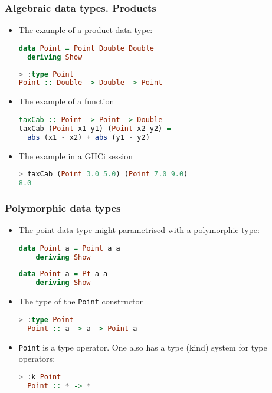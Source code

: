 \documentclass[10pt,pdf,utf8,russian,aspectratio=169]{beamer}
\begin{document}
\begin{frame}[fragile]
\frametitle{Algebraic data types. Products}

\begin{itemize}
\item The example of a product data type:

\begin{lstlisting}[language=Haskell]
data Point = Point Double Double
  deriving Show
\end{lstlisting}

\begin{lstlisting}[language=Haskell]
> :type Point
Point :: Double -> Double -> Point
\end{lstlisting}
\item The example of a function

\begin{lstlisting}[language=Haskell]
taxCab :: Point -> Point -> Double
taxCab (Point x1 y1) (Point x2 y2) =
  abs (x1 - x2) + abs (y1 - y2)
\end{lstlisting}

\item The example in a GHCi session
\begin{lstlisting}[language=Haskell]
> taxCab (Point 3.0 5.0) (Point 7.0 9.0)
8.0
\end{lstlisting}

\end{itemize}
\end{frame}

\begin{frame}[fragile]
  \frametitle{Polymorphic data types}

\begin{itemize}
  \item The point data type might parametrised with a polymorphic type:
  \begin{lstlisting}[language=Haskell]
  data Point a = Point a a
    deriving Show
  \end{lstlisting}

  \begin{lstlisting}[language=Haskell]
  data Point a = Pt a a
    deriving Show
  \end{lstlisting}
  \item The type of the \verb"Point" constructor
  \begin{lstlisting}[language=Haskell]
  > :type Point
  Point :: a -> a -> Point a
  \end{lstlisting}
  \item \verb"Point" is a type operator. One also has a type (kind) system for type operators:
  \begin{lstlisting}[language=Haskell]
  > :k Point
  Point :: * -> *
  \end{lstlisting}
\end{itemize}
\end{frame}
\end{document}
